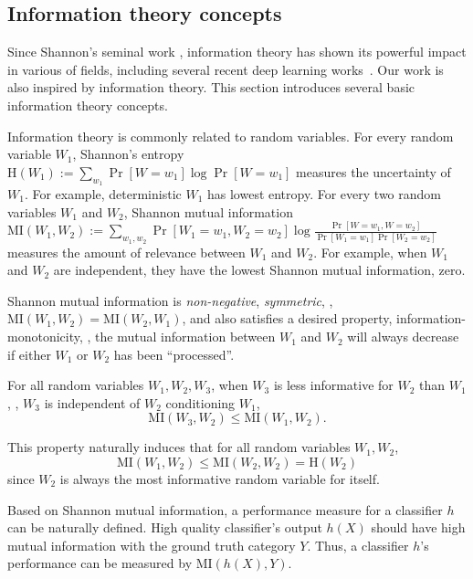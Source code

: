 \subsection{Information theory concepts}


Since Shannon's seminal work \cite{shannon}, information theory has shown its powerful impact in various of fields, including several recent deep learning works~\cite{hjelm2018learning, cao2018max,kong2018water}. Our work is also inspired by information theory. This section introduces several basic information theory concepts. 

Information theory is commonly related to random variables. For every random variable $W_1$, Shannon's entropy $\text{H}(W_1) := \sum_{w_1} \Pr[W=w_1]\log\Pr[W=w_1]$ measures the uncertainty of $W_1$. For example, deterministic $W_1$ has lowest entropy. For every two random variables $W_1$ and $W_2$, Shannon mutual information $\text{MI}(W_1,W_2):=\sum_{w_1,w_2}\Pr[W_1=w_1,W_2=w_2]\log\frac{\Pr[W=w_1,W=w_2]}{\Pr[W_1=w_1]\Pr[W_2=w_2]}$ measures the amount of relevance between $W_1$ and $W_2$. For example, when $W_1$ and $W_2$ are independent, they have the lowest Shannon mutual information, zero. 

Shannon mutual information is \emph{non-negative}, \emph{symmetric}, \ie, $\text{MI}(W_1,W_2)=\text{MI}(W_2,W_1)$, and also satisfies a desired property, information-monotonicity, \ie, the mutual information between $W_1$ and $W_2$ will always decrease if either $W_1$ or $W_2$ has been ``processed''. 

\begin{fact}
	For all random variables $W_1,W_2,W_3$, when $W_3$ is less informative for $W_2$ than $W_1$, \ie, $W_3$ is independent of $W_2$ conditioning $W_1$, \[\text{MI}(W_3,W_2)\leq \text{MI}(W_1,W_2).\]
\end{fact}
This property naturally induces that for all random variables $W_1, W_2$, \[\text{MI}(W_1,W_2)\leq \text{MI}(W_2,W_2)=\text{H}(W_2)\] since $W_2$ is always the most informative random variable for itself. 

Based on Shannon mutual information, a performance measure for a classifier $h$ can be naturally defined. High quality classifier's output $h(X)$ should have high mutual information with the ground truth category $Y$. Thus, a classifier $h$'s performance can be measured by $\text{MI}(h(X),Y)$. 

